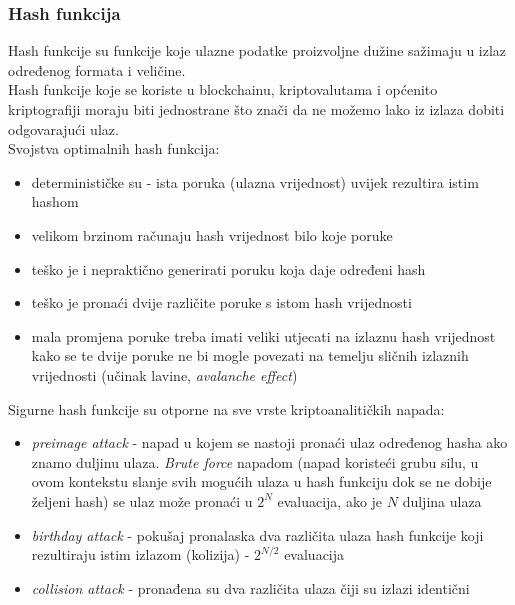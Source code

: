 \documentclass[12pt]{article}
\begin{document}
\subsubsection{Hash funkcija}
Hash funkcije su funkcije koje ulazne podatke proizvoljne dužine sažimaju u izlaz određenog formata i veličine.\\
Hash funkcije koje se koriste u blockchainu, kriptovalutama i općenito kriptografiji moraju biti jednostrane što znači da ne možemo lako iz izlaza dobiti odgovarajući ulaz.\\
Svojstva optimalnih hash funkcija:
\begin{itemize}
	\item determinističke su - ista poruka (ulazna vrijednost) uvijek rezultira istim hashom
	\item velikom brzinom računaju hash vrijednost bilo koje poruke
	\item teško je i nepraktično generirati poruku koja daje određeni hash
	\item teško je pronaći dvije različite poruke s istom hash vrijednosti
	\item mala promjena poruke treba imati veliki utjecati na izlaznu hash vrijednost kako se te dvije poruke ne bi mogle povezati na temelju sličnih izlaznih vrijednosti (učinak lavine, \textit{avalanche effect})\cite{ideal-hash-fun}
\end{itemize}
%
\pagebreak
Sigurne hash funkcije su otporne na sve vrste kriptoanalitičkih napada:
\begin{itemize}
	\item \textit{preimage attack} - napad u kojem se nastoji pronaći ulaz određenog hasha ako znamo duljinu ulaza. \textit{Brute force} napadom (napad koristeći grubu silu, u ovom kontekstu slanje svih mogućih ulaza u hash funkciju dok se ne dobije željeni hash) se ulaz može pronaći u $2^N$ evaluacija, ako je $N$ duljina ulaza
	\item \textit{birthday attack} - pokušaj pronalaska dva različita ulaza hash funkcije koji rezultiraju istim izlazom (kolizija) - $2^{N/2}$ evaluacija
	\item \textit{collision attack} - pronađena su dva različita ulaza čiji su izlazi identični
\end{itemize}
\end{document}
